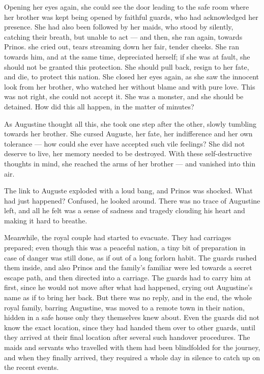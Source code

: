 Opening her eyes again, she could see the door leading to the safe room where her brother was kept being opened by faithful guards, who had acknowledged her presence. She had also been followed by her maids, who stood by silently, catching their breath, but unable to act --- and then, she ran again, towards Prinos.  she cried out, tears streaming down her fair, tender cheeks. She ran towards him, and at the same time, depreciated herself; if she was at fault, she should not be granted this protection. She should pull back, resign to her fate, and die, to protect this nation. She closed her eyes again, as she saw the innocent look from her brother, who watched her without blame and with pure love. This was not right, she could not accept it. She was a monster, and she should be detained. How did this all happen, in the matter of minutes?

As Augustine thought all this, she took one step after the other, slowly tumbling towards her brother. She cursed Auguste, her fate, her indifference and her own tolerance --- how could she ever have accepted such vile feelings? She did not deserve to live, her memory needed to be destroyed. With these self-destructive thoughts in mind, she reached the arms of her brother --- and vanished into thin air.

The link to Auguste exploded with a loud bang, and Prinos was shocked. What had just happened? Confused, he looked around. There was no trace of Augustine left, and all he felt was a sense of sadness and tragedy clouding his heart and making it hard to breathe.

Meanwhile, the royal couple had started to evacuate. They had carriages prepared; even though this was a peaceful nation, a tiny bit of preparation in case of danger was still done, as if out of a long forlorn habit. The guards rushed them inside, and also Prinos and the family's familiar were led towards a secret escape path, and then directed into a carriage. The guards had to carry him at first, since he would not move after what had happened, crying out Augustine's name as if to bring her back. But there was no reply, and in the end, the whole royal family, barring Augustine, was moved to a remote town in their nation, hidden in a safe house only they themselves knew about. Even the guards did not know the exact location, since they had handed them over to other guards, until they arrived at their final location after several such handover procedures. The maids and servants who travelled with them had been blindfolded for the journey, and when they finally arrived, they required a whole day in silence to catch up on the recent events.

